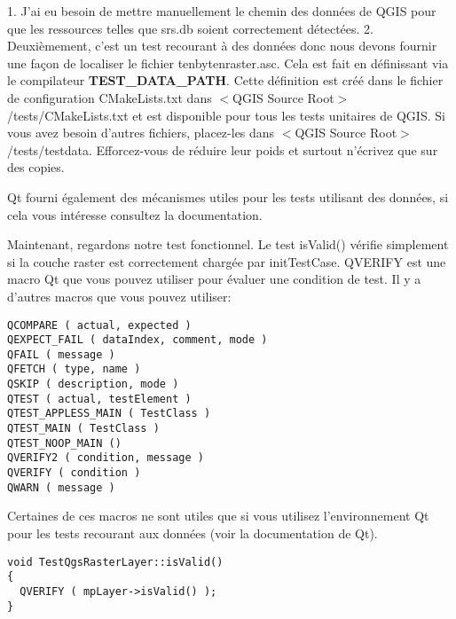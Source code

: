 1. J'ai eu besoin de mettre manuellement le chemin des données de QGIS pour que les ressources telles que srs.db soient correctement détectées.
 2. Deuxièmement, c'est un test recourant à des données donc nous devons fournir une façon de localiser le fichier tenbytenraster.asc. Cela est fait en définissant via le compilateur \textbf{TEST\_DATA\_PATH}. Cette définition est créé dans le fichier de configuration CMakeLists.txt dans $<$QGIS Source Root$>$/tests/CMakeLists.txt et est disponible pour tous les tests unitaires de QGIS. Si vous avez besoin d'autres fichiers, placez-les dans $<$QGIS Source Root$>$/tests/testdata. Efforcez-vous de réduire leur poids et surtout n'écrivez que sur des copies.

Qt fourni également des mécanismes utiles pour les tests utilisant des données, si cela vous intéresse consultez la documentation.

Maintenant, regardons notre test fonctionnel. Le test isValid() vérifie simplement si la couche raster est correctement chargée par initTestCase. QVERIFY est une macro Qt que vous pouvez utiliser pour évaluer une condition de test. Il y a d'autres macros que vous pouvez utiliser:

\begin{verbatim}
QCOMPARE ( actual, expected )
QEXPECT_FAIL ( dataIndex, comment, mode )
QFAIL ( message )
QFETCH ( type, name )
QSKIP ( description, mode )
QTEST ( actual, testElement )
QTEST_APPLESS_MAIN ( TestClass )
QTEST_MAIN ( TestClass )
QTEST_NOOP_MAIN ()
QVERIFY2 ( condition, message )
QVERIFY ( condition )
QWARN ( message ) 
\end{verbatim}

Certaines de ces macros ne sont utiles que si vous utilisez l'environnement Qt pour les tests recourant aux données (voir la documentation de Qt).

\begin{verbatim}
void TestQgsRasterLayer::isValid()
{
  QVERIFY ( mpLayer->isValid() );
}
\end{verbatim}

